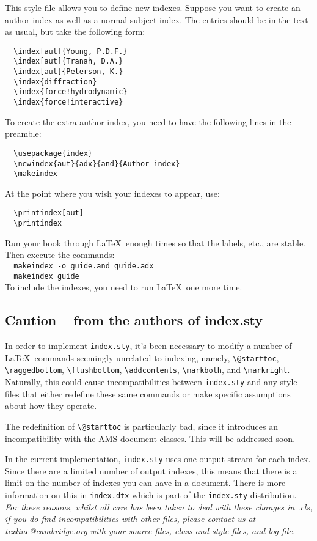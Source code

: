 This style file allows you to define new indexes. Suppose you want to create an author index as well as a normal subject index. The entries should be in the text as usual, but take the following form:
\begin{verbatim}
  \index[aut]{Young, P.D.F.}
  \index[aut]{Tranah, D.A.}
  \index[aut]{Peterson, K.}
  \index{diffraction}
  \index{force!hydrodynamic}
  \index{force!interactive}
\end{verbatim}
To create the extra author index, you need to have the following lines in the preamble:
\begin{verbatim}
  \usepackage{index}
  \newindex{aut}{adx}{and}{Author index}
  \makeindex
\end{verbatim}
At the point where you wish your indexes to appear, use:
\begin{verbatim}
  \printindex[aut]
  \printindex
\end{verbatim}
Run your book through \LaTeX\ enough times so that the labels, etc., are stable. Then execute the commands:\\[0.5\baselineskip]
\verb"  makeindex -o "\texttt{\cambridge guide.and \cambridge guide.adx}\\
\verb"  makeindex "\texttt{\cambridge guide}\\[0.5\baselineskip]
To include the indexes, you need to run \LaTeX\ one more time.

\subsection{Caution -- from the authors of index.sty}

In order to implement \verb"index.sty", it's been necessary to modify a number of \LaTeX\ commands seemingly unrelated to indexing, namely, \verb"\@starttoc", \verb"\raggedbottom", \verb"\flushbottom", \verb"\addcontents", \verb"\markboth", and \verb"\markright". Naturally, this could cause incompatibilities between \texttt{index.sty} and any style files that either redefine these same commands or make specific assumptions about how they operate.

The redefinition of \verb"\@starttoc" is particularly bad, since it introduces an incompatibility with the AMS document classes. This will be addressed soon.

In the current implementation, \texttt{index.sty} uses one output stream for each index.  Since there are a limited number of output indexes, this means that there is a limit on the number of indexes you can have in a document.  There is more information on this in \verb"index.dtx" which is part of the \verb"index.sty" distribution.\\[\baselineskip]
%
\textit{For these reasons, whilst all care has been taken to deal with these changes in \cambridge.cls, if you do find incompatibilities with other files, please contact us at texline@cambridge.org with your source files, class and style files, and log file.}

\endinput
